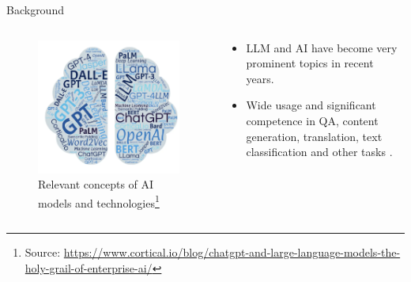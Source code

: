 \documentclass[t]{beamer}
\begin{document}
\begin{frame}{Background}
  \begin{columns}
    \begin{column}{0.4\textwidth}
        \begin{figure}
            \centering
            \includegraphics[width=\textwidth]{llm1.png}
            \caption{Relevant concepts of AI models and technologies\footnote{Source: \url{https://www.cortical.io/blog/chatgpt-and-large-language-models-the-holy-grail-of-enterprise-ai/}}}
            \label{fig:llm1}
        \end{figure}
    \end{column}
    \begin{column}{0.5\textwidth}
        \begin{itemize}
            \item LLM and AI have become very prominent topics in recent years.
            \newline
            \item Wide usage and significant competence in QA, content generation, translation, text classification and other tasks \cite{Liu23}.
        \end{itemize}
    \end{column}
\end{columns}
\end{frame}
\end{document}
